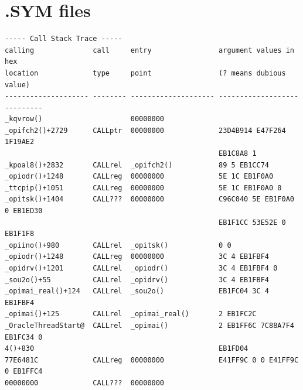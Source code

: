 \section{.SYM files}



\begin{lstlisting}
----- Call Stack Trace -----
calling              call     entry                argument values in hex      
location             type     point                (? means dubious value)     
-------------------- -------- -------------------- ----------------------------
_kqvrow()                     00000000             
_opifch2()+2729      CALLptr  00000000             23D4B914 E47F264 1F19AE2
                                                   EB1C8A8 1
_kpoal8()+2832       CALLrel  _opifch2()           89 5 EB1CC74
_opiodr()+1248       CALLreg  00000000             5E 1C EB1F0A0
_ttcpip()+1051       CALLreg  00000000             5E 1C EB1F0A0 0
_opitsk()+1404       CALL???  00000000             C96C040 5E EB1F0A0 0 EB1ED30
                                                   EB1F1CC 53E52E 0 EB1F1F8
_opiino()+980        CALLrel  _opitsk()            0 0
_opiodr()+1248       CALLreg  00000000             3C 4 EB1FBF4
_opidrv()+1201       CALLrel  _opiodr()            3C 4 EB1FBF4 0
_sou2o()+55          CALLrel  _opidrv()            3C 4 EB1FBF4
_opimai_real()+124   CALLrel  _sou2o()             EB1FC04 3C 4 EB1FBF4
_opimai()+125        CALLrel  _opimai_real()       2 EB1FC2C
_OracleThreadStart@  CALLrel  _opimai()            2 EB1FF6C 7C88A7F4 EB1FC34 0
4()+830                                            EB1FD04
77E6481C             CALLreg  00000000             E41FF9C 0 0 E41FF9C 0 EB1FFC4
00000000             CALL???  00000000             
\end{lstlisting}


